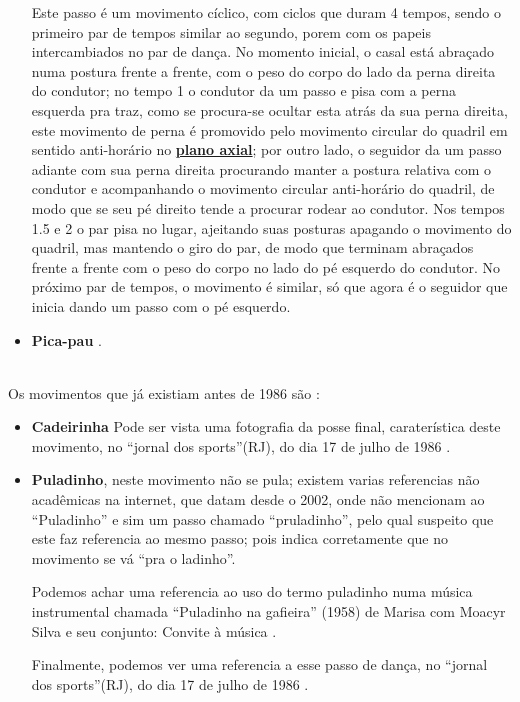 \begin{itemize}
Este passo é um movimento cíclico, com ciclos que duram 4 tempos, 
sendo o primeiro par de tempos similar ao segundo, porem com os papeis intercambiados no par de dança.
No momento inicial, o casal está abraçado numa postura frente a frente, 
com o peso do corpo do lado da perna direita do condutor;
no tempo 1 o condutor da um passo e pisa com a perna esquerda pra traz, 
como se procura-se ocultar esta atrás da sua perna direita, 
este movimento de perna é promovido pelo movimento circular do quadril em sentido anti-horário no \hyperref[def:PlanoAxial]{\textbf{plano axial}};
por outro lado, 
o seguidor da um passo adiante com sua perna direita procurando manter a postura relativa com o condutor e acompanhando o movimento circular anti-horário do quadril, 
de modo que se seu pé direito tende a procurar rodear ao condutor.
Nos tempos 1.5 e 2 o par pisa no lugar, ajeitando suas posturas apagando o movimento do quadril, 
mas mantendo o giro do par, 
de modo que terminam abraçados  frente a frente com o peso do corpo no lado do pé esquerdo do condutor.
No próximo par de tempos, o movimento é similar, só que agora é o seguidor que inicia dando um passo com o pé esquerdo. 

\item \textbf{Pica-pau} . 
\end{itemize}~\\



Os movimentos que já existiam antes de 1986 são \cite[pp. 6]{gafieiraaredeout2}:
\begin{itemize}
\item \textbf{Cadeirinha} 
Pode ser vista uma fotografia da posse final, caraterística deste movimento, no ``jornal dos sports''(RJ),
do dia 17 de julho de 1986 \cite[pp. 6]{gafieiraaredeout2}.

\item \textbf{Puladinho}, 
neste movimento não se pula; 
existem varias referencias não acadêmicas na internet, que datam desde o 2002,
onde não mencionam ao ``Puladinho'' e sim um passo chamado ``pruladinho'', 
pelo qual suspeito que este faz referencia ao mesmo passo;
pois indica corretamente que no movimento se vá ``pra o ladinho''.

Podemos achar uma referencia ao uso do termo puladinho numa música instrumental chamada 
``Puladinho na gafieira'' (1958)  de  Marisa com Moacyr Silva e seu conjunto: Convite à música \cite{puladinhogafieiramusic}.

Finalmente, podemos ver uma referencia a esse passo de dança, no ``jornal dos sports''(RJ),
do dia 17 de julho de 1986 \cite[pp. 6]{gafieiraaredeout2}.
\end{itemize}~\\

